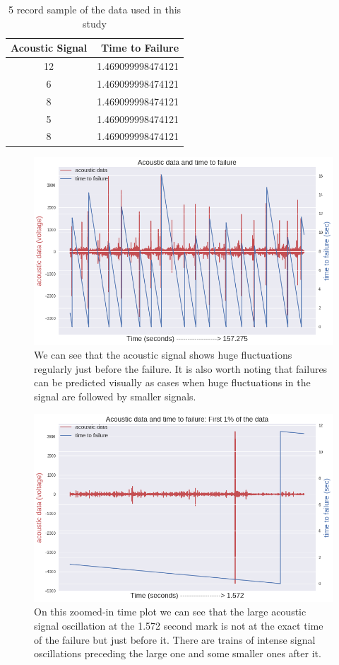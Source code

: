 \documentclass[]{llncs} %
\begin{document}
\begin{table}
	\begin{center}
		\caption{5 record sample of the data used in this study}
		\label{tab:SampleData}
		\begin{tabular}{c|r} 
			\textbf{Acoustic Signal} & \textbf{Time to Failure}\\
			\hline
			12 & 1.469099998474121 \\ 
			6 & 1.469099998474121 \\ 
			8 & 1.469099998474121 \\ 
			5 & 1.469099998474121 \\ 
			8 & 1.469099998474121 \\ 
		\end{tabular}
	\end{center}
\end{table}
\begin{figure}
	\centering
	\includegraphics[width=.9\linewidth]{timeSeries}
	\caption{We can see that the acoustic signal shows huge fluctuations regularly just before the failure. It is also worth noting that failures can be predicted visually as cases when huge fluctuations in the signal are followed by smaller signals.}
	\label{fig:timeseries}
\end{figure}
\begin{figure}
	\centering
	\includegraphics[width=.9\linewidth]{zoomedInTimePLot}
	\caption{On this zoomed-in time plot we can see that the large acoustic signal oscillation at the 1.572 second mark is not at the exact time of the failure but  just before it. There are trains of intense signal oscillations preceding the large one and some smaller ones after it.}
	\label{fig:zoomeInTimePlot}
\end{figure}
\end{document}
